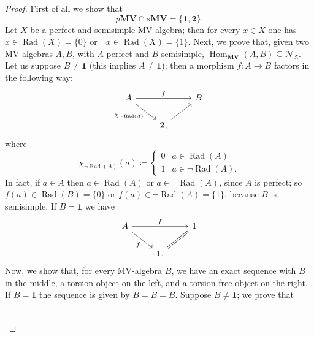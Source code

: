 \documentclass[10pt,a4paper]{amsart}
\DeclareMathOperator{\Hom}{Hom}
\DeclareMathOperator{\Rad}{Rad}
\newcommand{\graffe}[1]{\{ #1 \}}
\newcommand{\initial}{\boldsymbol{2}}
\newcommand{\mv}{\mathbf{MV}}
\newcommand{\terminal}{\boldsymbol{1}}
\newcommand{\zeros}{\mathcal{Z}}
\newcommand{\zideal}{\mathcal{N}_{\zeros}}
\begin{document}
		\begin{proof}
			First of all we show that
			\[ p\mv \cap s\mv= \{ \terminal, \initial \}. \]
			Let $X$ be a perfect and semisimple MV-algebra; then for every $x \in X$ one has $x \in \Rad(X)=\graffe{0}$ or $\lnot x \in \Rad(X)=\graffe{1}$. Next, we prove that, given two MV-algebras $A,B$, with $A$ perfect and $B$ semisimple, $\Hom_{\mv}(A,B)\subseteq \zideal$. Let us suppose $B \neq \terminal$ (this implies $A \neq \terminal$); then a morphism $f \colon A \rightarrow B$ factors in the following way:
			\[\begin{tikzcd}
				A && B \\
				& {\initial,}
				\arrow["f", from=1-1, to=1-3]
				\arrow["{\chi_{\lnot \Rad(A)}}"', from=1-1, to=2-2]
				\arrow[from=2-2, to=1-3]
			\end{tikzcd}\]
			where
			\[ \chi_{\lnot \Rad(A)}(a) \coloneqq \begin{cases}
				0 & a \in \Rad(A) \\
				1 & a \in \lnot \Rad(A).
			\end{cases}
			\]
			In fact, if $a \in A$ then $a \in \Rad(A)$ or $a \in \lnot \Rad(A)$, since $A$ is perfect; so $f(a) \in \Rad(B)=\{ 0 \}$ or $f(a) \in \lnot \Rad(A)=\{ 1 \}$, because $B$ is semisimple.
			If $B= \terminal$ we have
			\[\begin{tikzcd}
				A && {\terminal} \\
				& {\terminal.}
				\arrow["f", from=1-1, to=1-3]
				\arrow["f"', from=1-1, to=2-2]
				\arrow[equals, from=2-2, to=1-3]
			\end{tikzcd}\]
			Now, we show that, for every MV-algebra $B$, we have an exact sequence with $B$ in the middle, a torsion object on the left, and a torsion-free object on the right. If $B= \terminal$ the sequence is given by $B=B=B$. Suppose $B \neq \terminal$; we prove that
			\[\begin{tikzcd}

\end{tikzcd}\]
\end{proof}
\end{document}
